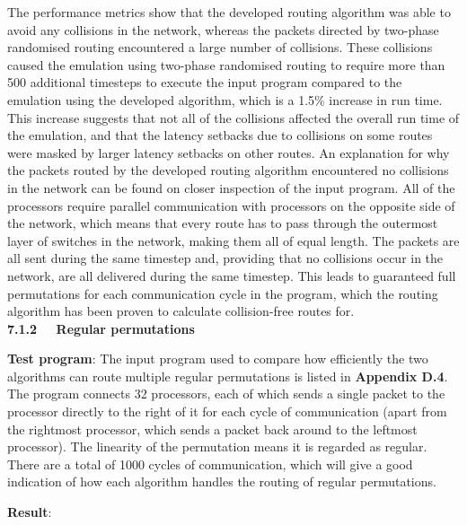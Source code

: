 \documentclass[a4paper, 12pt]{article}
\begin{document}
The performance metrics show that the developed routing algorithm was able to avoid any collisions in the network, whereas the packets directed by two-phase randomised routing encountered a large number of collisions. These collisions caused the emulation using two-phase randomised routing to require more than 500 additional timesteps to execute the input program compared to the emulation using the developed algorithm, which is a 1.5\% increase in run time. This increase suggests that not all of the collisions affected the overall run time of the emulation, and that the latency setbacks due to collisions on some routes were masked by larger latency setbacks on other routes. An explanation for why the packets routed by the developed routing algorithm encountered no collisions in the network can be found on closer inspection of the input program. All of the processors require parallel communication with processors on the opposite side of the network, which means that every route has to pass through the outermost layer of switches in the network, making them all of equal length. The packets are all sent during the same timestep and, providing that no collisions occur in the network, are all delivered during the same timestep. This leads to guaranteed full permutations for each communication cycle in the program, which the routing algorithm has been proven to calculate collision-free routes for.\\

\noindent\textbf{7.1.2 \ \ Regular permutations}

\noindent\textbf{Test program}: The input program used to compare how efficiently the two algorithms can route multiple regular permutations is listed in \textbf{Appendix D.4}. The program connects 32 processors, each of which sends a single packet to the processor directly to the right of it for each cycle of communication (apart from the rightmost processor, which sends a packet back around to the leftmost processor). The linearity of the permutation means it is regarded as regular. There are a total of 1000 cycles of communication, which will give a good indication of how each algorithm handles the routing of regular permutations.

\noindent\textbf{Result}:
\end{document}
